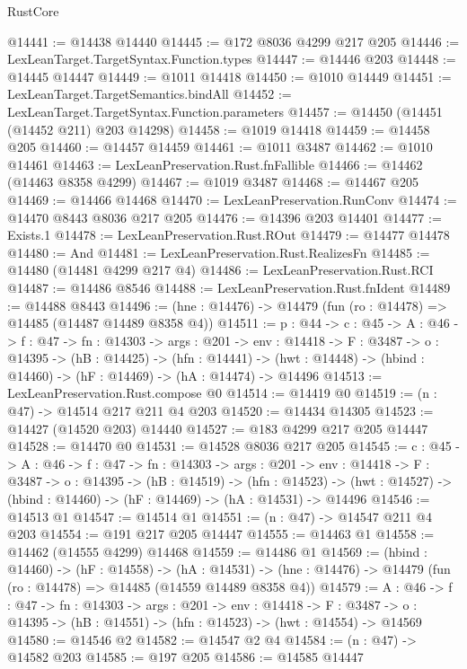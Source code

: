 \begin{lexlean}{RustCore}
\begin{coremodule}
@14441 := @14438 @14440
@14445 := @172 @8036 @4299 @217 @205
@14446 := LexLeanTarget.TargetSyntax.Function.types
@14447 := @14446 @203
@14448 := @14445 @14447
@14449 := @1011 @14418
@14450 := @1010 @14449
@14451 := LexLeanTarget.TargetSemantics.bindAll
@14452 := LexLeanTarget.TargetSyntax.Function.parameters
@14457 := @14450 (@14451 (@14452 @211) @203 @14298)
@14458 := @1019 @14418
@14459 := @14458 @205
@14460 := @14457 @14459
@14461 := @1011 @3487
@14462 := @1010 @14461
@14463 := LexLeanPreservation.Rust.fnFallible
@14466 := @14462 (@14463 @8358 @4299)
@14467 := @1019 @3487
@14468 := @14467 @205
@14469 := @14466 @14468
@14470 := LexLeanPreservation.RunConv
@14474 := @14470 @8443 @8036 @217 @205
@14476 := @14396 @203 @14401
@14477 := Exists.{1}
@14478 := LexLeanPreservation.Rust.ROut
@14479 := @14477 @14478
@14480 := And
@14481 := LexLeanPreservation.Rust.RealizesFn
@14485 := @14480 (@14481 @4299 @217 @4)
@14486 := LexLeanPreservation.Rust.RCI
@14487 := @14486 @8546
@14488 := LexLeanPreservation.Rust.fnIdent
@14489 := @14488 @8443
@14496 := (hne : @14476) -> @14479 (fun (ro : @14478) => @14485 (@14487 @14489 @8358 @4))
@14511 := {p : @44} ->
  {c : @45} ->
  {A : @46} ->
  {f : @47} ->
  {fn : @14303} ->
  {args : @201} ->
  {env : @14418} ->
  {F : @3487} ->
  {o : @14395} ->
  (hB : @14425) ->
  (hfn : @14441) -> (hwt : @14448) -> (hbind : @14460) -> (hF : @14469) -> (hA : @14474) -> @14496
@14513 := LexLeanPreservation.Rust.compose @0
@14514 := @14419 @0
@14519 := (n : @47) -> @14514 @217 @211 @4 @203
@14520 := @14434 @14305
@14523 := @14427 (@14520 @203) @14440
@14527 := @183 @4299 @217 @205 @14447
@14528 := @14470 @0
@14531 := @14528 @8036 @217 @205
@14545 := {c : @45} ->
  {A : @46} ->
  {f : @47} ->
  {fn : @14303} ->
  {args : @201} ->
  {env : @14418} ->
  {F : @3487} ->
  {o : @14395} ->
  (hB : @14519) ->
  (hfn : @14523) -> (hwt : @14527) -> (hbind : @14460) -> (hF : @14469) -> (hA : @14531) -> @14496
@14546 := @14513 @1
@14547 := @14514 @1
@14551 := (n : @47) -> @14547 @211 @4 @203
@14554 := @191 @217 @205 @14447
@14555 := @14463 @1
@14558 := @14462 (@14555 @4299) @14468
@14559 := @14486 @1
@14569 := (hbind : @14460) ->
  (hF : @14558) ->
  (hA : @14531) -> (hne : @14476) -> @14479 (fun (ro : @14478) => @14485 (@14559 @14489 @8358 @4))
@14579 := {A : @46} ->
  {f : @47} ->
  {fn : @14303} ->
  {args : @201} ->
  {env : @14418} ->
  {F : @3487} -> {o : @14395} -> (hB : @14551) -> (hfn : @14523) -> (hwt : @14554) -> @14569
@14580 := @14546 @2
@14582 := @14547 @2 @4
@14584 := (n : @47) -> @14582 @203
@14585 := @197 @205
@14586 := @14585 @14447

\end{coremodule}
\end{lexlean}
